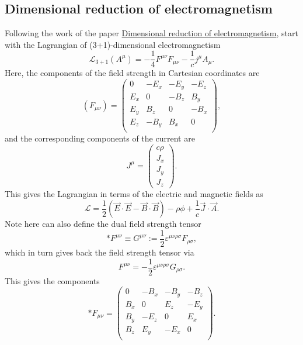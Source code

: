 \documentclass{article}
\begin{document}
\subsection{Dimensional reduction of electromagnetism}
Following the work of the paper \href{https://arxiv.org/pdf/2111.10728.pdf}{Dimensional reduction of electromagnetism}, start with the Lagrangian of (3+1)-dimensional electromagnetism
\begin{equation}
    \mathcal{L}_{3+1}\left(A^{\mu}\right) = -\frac{1}{4}F^{\mu\nu}F_{\mu\nu} - \frac{1}{c}j^{\mu}A_{\mu}.
\end{equation}
Here, the components of the field strength in Cartesian coordinates are
\begin{equation}
    \left(F_{\mu\nu}\right) = \begin{pmatrix}
        0 & -E_x & -E_y & -E_z \\
        E_x & 0 & -B_z & B_y \\
        E_y & B_z & 0 & -B_x \\
        E_z & -B_y & B_x & 0 \\
    \end{pmatrix}, 
\end{equation}
and the corresponding components of the current are
\begin{equation}
    J^\mu = \begin{pmatrix}
        c \rho \\
        J_{x} \\
        J_{y} \\
        J_{z}
    \end{pmatrix}.
\end{equation}
This gives the Lagrangian in terms of the electric and magnetic fields as
\begin{equation}
    \mathcal{L} = \frac{1}{2}\left(\vec{E}\cdot\vec{E} - \vec{B}\cdot\vec{B}\right)-\rho\phi + \frac{1}{c}\vec{J}\cdot\vec{A}.
\end{equation}
Note here can also define the dual field strength tensor
\begin{equation}
    *F^{\mu\nu} \equiv G^{\mu\nu} := \frac{1}{2}\varepsilon^{\mu\nu\rho\sigma}F_{\rho\sigma},
\end{equation}
which in turn gives back the field strength tensor via
\begin{equation}
    F^{\mu\nu} = -\frac{1}{2}\varepsilon^{\mu\nu\rho\sigma}G_{\rho\sigma}.
\end{equation}
This gives the components
\begin{equation}
    *\!F_{\mu\nu} = \begin{pmatrix}
        0 & -B_x & -B_y & -B_z \\
        B_x & 0 & E_z & -E_y \\
        B_y & -E_z & 0 & E_x \\
        B_z & E_y & -E_x & 0 \\
    \end{pmatrix}.
\end{equation}
\end{document}

